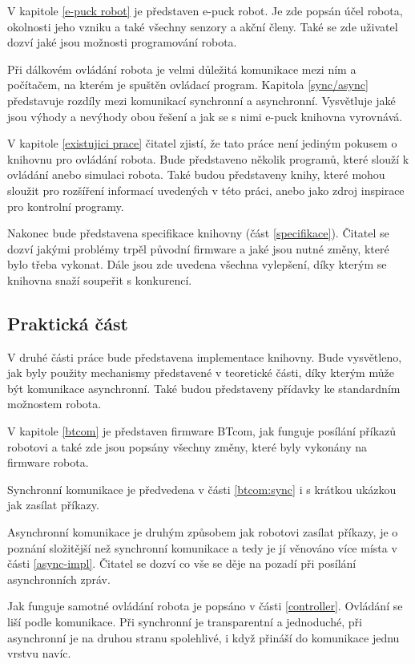 V kapitole \ref{e-puck robot} je představen e-puck robot. Je zde popsán
účel robota, okolnosti jeho vzniku a také všechny senzory a akční členy.
Také se zde uživatel dozví jaké jsou možnosti programování robota.

Při dálkovém ovládání robota je velmi důležitá komunikace mezi ním a
počítačem, na kterém je spuštěn ovládací program. Kapitola \ref{sync/async}
představuje rozdíly mezi komunikací synchronní a asynchronní. Vysvětluje
jaké jsou výhody a nevýhody obou řešení a jak se s nimi e-puck knihovna
vyrovnává.

V kapitole \ref{existujici prace} čitatel zjistí, že tato práce není
jediným pokusem o knihovnu pro ovládání robota. Bude představeno několik
programů, které slouží k ovládání anebo simulaci robota. Také budou
představeny knihy, které mohou sloužit pro rozšíření informací uvedených v
této práci, anebo jako zdroj inspirace pro kontrolní programy.

Nakonec bude představena specifikace knihovny (část \ref{specifikace}).
Čitatel se dozví jakými problémy trpěl původní firmware a jaké jsou nutné
změny, které bylo třeba vykonat. Dále jsou zde uvedena všechna vylepšení,
díky kterým se knihovna snaží soupeřit s konkurencí.

\subsection*{Praktická část}
V druhé části práce bude představena implementace knihovny. Bude
vysvětleno, jak byly použity mechanismy představené v teoretické části,
díky kterým může být komunikace asynchronní. Také budou představeny
přídavky ke standardním možnostem robota.

V kapitole \ref{btcom} je představen firmware BTcom, jak funguje posílání
příkazů robotovi a také zde jsou popsány všechny změny, které byly vykonány
na firmware robota.

Synchronní komunikace je předvedena v části \ref{btcom:sync} i s krátkou
ukázkou jak zasílat příkazy.

Asynchronní komunikace je druhým způsobem jak robotovi zasílat příkazy, je
o poznání složitější než synchronní komunikace a tedy je jí věnováno více
místa v části \ref{async-impl}. Čitatel se dozví co vše se děje na pozadí
při posílání asynchronních zpráv.

Jak funguje samotné ovládání robota je popsáno v části \ref{controller}.
Ovládání se liší podle komunikace. Při synchronní je transparentní a
jednoduché, při asynchronní je na druhou stranu spolehlivé, i když přináší
do komunikace jednu vrstvu navíc.

